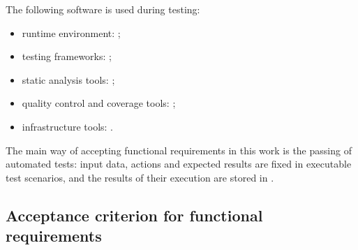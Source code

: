 \documentclass[12pt,a4paper]{extarticle}
\begin{document}
\begin{hseExample}
The following software is used during testing:

\begin{itemize}[leftmargin=1.25cm]
    \item runtime environment: ;
    \item testing frameworks: ;
    \item static analysis tools: ;
    \item quality control and coverage tools: ;
    \item infrastructure tools: .
\end{itemize}

The main way of accepting functional requirements in this work is the passing of automated tests: input data, actions and expected results are fixed in executable test scenarios, and the results of their execution are stored in .
\end{hseExample}

\subsection{Acceptance criterion for functional requirements}
\end{document}
